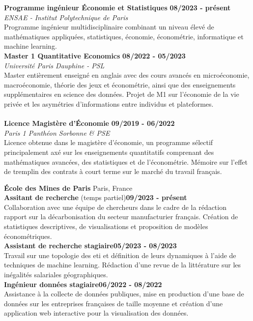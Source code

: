 \begin{flushleft}
\raisebox{-.6ex}{FORMATION} \hrulefill
\end{flushleft}

	
\noindent\textbf{Programme ingénieur \textbar\space Économie et Statistiques}
\hfill
\textbf{08/2023 - présent} \\
\emph{ENSAE - Institut Polytechnique de Paris}\\
Programme ingénieur multidisciplinaire combinant un niveau élevé de mathématiques appliquées, statistiques,  économie, économétrie, informatique et machine learning. \\

\noindent\textbf{Master 1 \textbar\space Quantitative Economics}
\hfill
\textbf{08/2022 - 05/2023} \\
\emph{Université Paris Dauphine - PSL}\\
Master entièrement enseigné en anglais avec des cours avancés en microéconomie, macroéconomie, théorie des jeux et économétrie, ainsi que des enseignements supplémentaires en science des données. Projet de M1 sur l'économie de la vie privée et les asymétries d'informations entre individus et plateformes.\\
\\
\noindent\textbf{Licence \textbar\space Magistère d'Économie}
\hfill
\textbf{09/2019 - 06/2022} \\
\emph{Paris 1 Panthéon Sorbonne \& PSE}\\
Licence obtenue dans le magistère d'économie, un programme sélectif principalement axé sur les enseignements quantitatifs comprenant des mathématiques avancées, des statistiques et de l'économétrie. Mémoire sur l'effet de tremplin des contrats à court terme sur le marché du travail français.

	\begin{flushleft}
	\raisebox{-.6ex}{EXPÉRIENCES PROFESSIONNELLES} \hrulefill
	\end{flushleft}


\noindent\textbf{École des Mines de Paris} \hfill Paris, France\\[0.1cm]
\textbf{Assitant de recherche} (temps partiel)\hfill \textbf{09/2023 - présent} \\
Collaboration avec une équipe de chercheurs dans le cadre de la rédaction rapport sur la décarbonisation du secteur manufacturier français. Création de statistiques descriptives, de visualisations et proposition de modèles économétriques. \\[0.15cm]
\textbf{Assistant de recherche stagiaire}\hfill \textbf{05/2023 - 08/2023} \\
Travail sur une topologie des eti et définition de leurs dynamiques à l'aide de techniques de machine learning. Rédaction d'une revue de la littérature sur les inégalités salariales géographiques. \\[0.15cm]
\textbf{Ingénieur données stagiaire}\hfill \textbf{06/2022 - 08/2022} \\
Assistance à la collecte de données publiques, mise en production d'une base de données sur les entreprises françaises de taille moyenne et création d'une application web interactive pour la visualisation des données.\\

